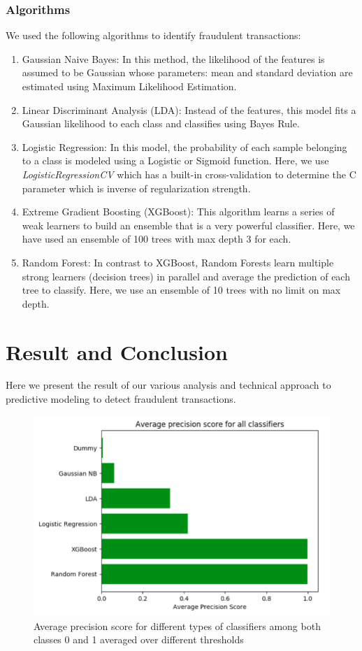 \documentclass[letterpaper, 12 pt, conference]{ieeeconf}  %
\begin{document}
\subsubsection{Algorithms}
We used the following algorithms to identify fraudulent transactions:
\begin{enumerate}
    \item Gaussian Naive Bayes: In this method, the likelihood of the features is assumed to be Gaussian whose parameters: mean and standard deviation are estimated using Maximum Likelihood Estimation.
    \item Linear Discriminant Analysis (LDA): Instead of the features, this model fits a Gaussian likelihood to each class and classifies using Bayes Rule.
    \item Logistic Regression: In this model, the probability of each sample belonging to a class is modeled using a Logistic or Sigmoid function. Here, we use \textit{LogisticRegressionCV} which has a built-in cross-validation to determine the C parameter which is inverse of regularization strength. 
    \item Extreme Gradient Boosting (XGBoost): This algorithm learns a series of weak learners to build an ensemble that is a very powerful classifier. Here, we have used an ensemble of 100 trees with max depth 3 for each.
    \item Random Forest: In contrast to XGBoost, Random Forests learn multiple strong learners (decision trees) in parallel and average the prediction of each tree to classify. Here, we use an ensemble of 10 trees with no limit on max depth.
\end{enumerate}


\section{Result and Conclusion}\label{sec:results}
Here we present the result of our various analysis and technical approach to predictive modeling to detect fraudulent transactions.

\begin{figure}[ht]
    \centering
    \includegraphics[width=\linewidth]{average_precision_score.png}
    \caption{Average precision score for different types of classifiers among both classes 0 and 1 averaged over different thresholds }
    \label{fig:avg_precision_score}
\end{figure}
\end{document}
